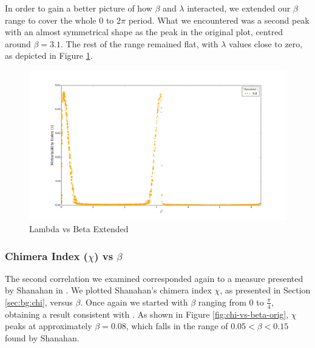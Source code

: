 \documentclass[a4paper,11pt]{article}
\begin{document}
In order to gain a better picture of how $\beta$ and $\lambda$ interacted, we extended our $\beta$ range to cover the whole $0$ to $2\pi$ period. What we encountered was a second peak with an almost symmetrical shape as the peak in the original plot, centred around $\beta = 3.1$. The rest of the range remained flat, with $\lambda$ values close to zero, as depicted in Figure \ref{fig:lambda-vs-beta-ext}.

\begin{figure}[H]
\begin{center}
\includegraphics[scale = 0.35]{figures/lambda_vs_beta_ext}
\end{center}
\caption{
	Lambda vs Beta Extended
	\label{fig:lambda-vs-beta-ext}
}
\end{figure}

\subsubsection{Chimera Index ($\chi$) vs $\beta$}
\label{sec:app:osc:res:chi-v-beta}

The second correlation we examined corresponded again to a measure presented by Shanahan in \cite{Shanahan2010}. We plotted Shanahan's chimera index $\chi$, as presented in Section \ref{sec:bg:chi}, versus $\beta$. Once again we started with $\beta$ ranging from $0$ to $\frac{\pi}{4}$, obtaining a result consistent with \cite{Shanahan2010}. As shown in Figure \ref{fig:chi-vs-beta-orig}, $\chi$ peaks at approximately $\beta = 0.08$, which falls in the range of $0.05 < \beta < 0.15$ found by Shanahan.
\end{document}
